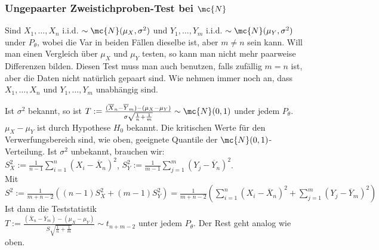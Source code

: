 \subsubsection{Ungepaarter Zweistichproben-Test bei $\mc{N}$}
Sind $X_1, \dots, X_n$ i.i.d. $\sim \mc{N}(\mu_X, \sigma^2)$ und $Y_1, \dots, Y_m$ i.i.d. $\sim \mc{N}(\mu_Y, \sigma^2)$ under $P_\theta$, wobei die Var in beiden Fällen dieselbe ist, aber $m \neq n$ sein kann. Will man einen Vergleich über $\mu_X$ und $\mu_Y$ testen, so kann man nicht mehr paarweise Differenzen bilden. Diesen Test muss man auch benutzen, falls zufällig $m = n$ ist, aber die Daten nicht natürlich gepaart sind. Wie nehmen immer noch an, dass $X_1, \dots, X_n$ und $Y_1, \dots, Y_m$ unabhängig sind.
\begin{itemize}
     Ist $\sigma^2$ bekannt, so ist $T := \frac{(\overline{X}_n - \overline{Y}_m) - (\mu_X - \mu_Y)}{\sigma \sqrt{\frac{1}{n} + \frac{1}{m}}} \sim \mc{N}(0, 1)$ under jedem $P_\theta$. $\mu_X - \mu_Y$ ist durch Hypothese $H_0$ bekannt. Die kritischen Werte für den Verwerfungsbereich sind, wie oben, geeignete Quantile der $\mc{N}(0, 1)$-Verteilung.
     Ist $\sigma^2$ unbekannt, brauchen wir: \\
    $S_X^2:= \frac{1}{n - 1} \sum_{i=1}^{n}(X_i - \overline{X}_n)^2$,
    $S_Y^2:= \frac{1}{m - 1} \sum_{j=1}^{m}(Y_j - \overline{Y}_n)^2$. \\
    Mit $S^2 := \frac{1}{m + n - 2}((n - 1)S_X^2 + (m - 1)S_Y^2) = \frac{1}{m + n - 2} (\sum_{i=1}^{n} (X_i - \overline{X}_n)^2 + \sum_{j=1}^{m}(Y_j - \overline{Y}_m)^2)$\\
   Ist dann die Teststatistik\\
   $T := \frac{(\overline{X}_n - \overline{Y}_m) - (\mu_X - \mu_Y)}{S \sqrt{\frac{1}{n} + \frac{1}{m}}} \sim t_{n + m - 2}$ unter jedem $P_\theta$. Der Rest geht analog wie oben.
\end{itemize}

